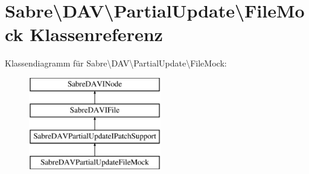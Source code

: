 \hypertarget{class_sabre_1_1_d_a_v_1_1_partial_update_1_1_file_mock}{}\section{Sabre\textbackslash{}D\+AV\textbackslash{}Partial\+Update\textbackslash{}File\+Mock Klassenreferenz}
\label{class_sabre_1_1_d_a_v_1_1_partial_update_1_1_file_mock}
Klassendiagramm für Sabre\textbackslash{}D\+AV\textbackslash{}Partial\+Update\textbackslash{}File\+Mock\+:\begin{figure}[H]
\begin{center}
\leavevmode
\includegraphics[height=4.000000cm]{class_sabre_1_1_d_a_v_1_1_partial_update_1_1_file_mock}
\end{center}
\end{figure}
